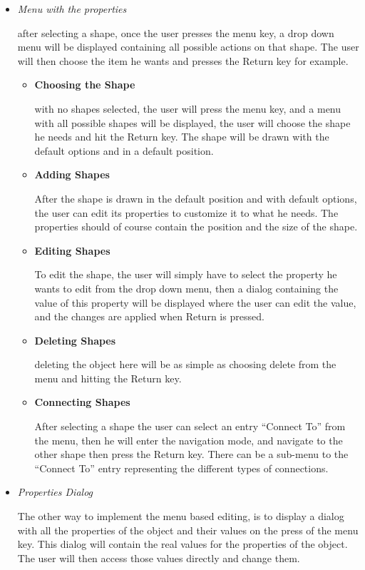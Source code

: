 \begin{itemize}
\item {\it Menu with the properties}
\par \noindent
after selecting a shape, once the user presses the menu key, a drop down menu will be displayed containing all possible actions on that shape. The user will then choose the item he wants and presses the Return key for example.

	\begin{itemize}
	\item {\bf Choosing the Shape}
	\par \noindent
	with no shapes selected, the user will press the menu key, and a menu with all possible shapes will be displayed, the user will choose the shape he needs and hit the Return key. The shape will be drawn with the default options and in a default position.
	
	\item {\bf Adding Shapes}
	\par \noindent
	After the shape is drawn in the default position and with default options, the user can edit its properties to customize it to what he needs. The properties should of course contain the position and the size of the shape.

	\item {\bf Editing Shapes}
	\par \noindent
	To edit the shape, the user will simply have to select the property he wants to edit from the drop down menu, then a dialog containing the value of this property will be displayed where the user can edit the value, and the changes are applied when Return is pressed.

	\item {\bf Deleting Shapes}
	\par \noindent
	deleting the object here will be as simple as choosing delete from the menu and hitting the Return key.

	\item {\bf Connecting Shapes}
	\par \noindent
	After selecting a shape the user can select an entry ``Connect To'' from the menu, then he will enter the navigation mode, and navigate to the other shape then press the Return key. There can be a sub-menu to the ``Connect To'' entry representing the different types of connections.
	\end{itemize}

\item {\it Properties Dialog}
\par \noindent
The other way to implement the menu based editing, is to display a dialog with all the properties of the object and their values on the press of the menu key. This dialog will contain the real values for the properties of the object. The user will then access those values directly and change them.


\end{itemize}
